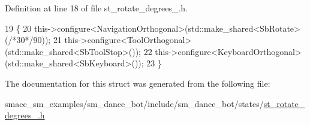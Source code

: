Definition at line 18 of file st\+\_\+rotate\+\_\+degrees\+\_.\+h.


\begin{DoxyCode}
19   \{
20     this->configure<NavigationOrthogonal>(std::make\_shared<SbRotate>(\textcolor{comment}{/*30*/}90));
21     this->configure<ToolOrthogonal>(std::make\_shared<SbToolStop>());
22     this->configure<KeyboardOrthogonal>(std::make\_shared<SbKeyboard>());
23   \}
\end{DoxyCode}


The documentation for this struct was generated from the following file\+:\begin{DoxyCompactItemize}
\item 
smacc\+\_\+sm\+\_\+examples/sm\+\_\+dance\+\_\+bot/include/sm\+\_\+dance\+\_\+bot/states/\hyperlink{st__rotate__degrees__1_8h}{st\+\_\+rotate\+\_\+degrees\+\_.\+h}\end{DoxyCompactItemize}
